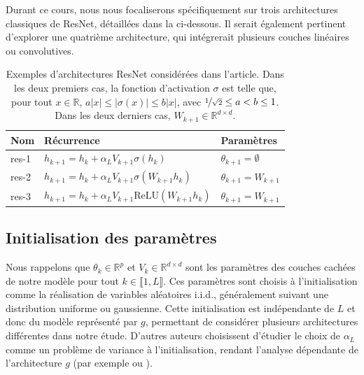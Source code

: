 Durant ce cours, nous nous focaliserons spécifiquement sur trois architectures classiques de ResNet, détaillées dans la  ci-dessous. Il serait également pertinent d'explorer une quatrième architecture, qui intégrerait plusieurs couches linéaires ou convolutives.

\begin{table}[H]
    \centering
    \begin{tabular}{lll}
        \hline
        \textbf{Nom} & \textbf{Récurrence} & \textbf{Paramètres} \\ \hline
        res-1 & \( h_{k+1} = h_k + \alpha_L V_{k+1}\sigma(h_k) \) & \( \theta_{k+1} = \emptyset \) \\
        res-2 & \( h_{k+1} = h_k + \alpha_L V_{k+1}\sigma(W_{k+1}h_k) \) & \( \theta_{k+1} = W_{k+1} \) \\
        res-3 & \( h_{k+1} = h_k + \alpha_L V_{k+1}\text{ReLU}(W_{k+1}h_k) \) & \( \theta_{k+1} = W_{k+1} \) \\ \hline
    \end{tabular}
    \caption{Exemples d'architectures ResNet considérées dans l'article. Dans les deux premiers cas, la fonction d'activation \( \sigma \) est telle que, pour tout \( x \in \mathbb{R} \), \( a|x| \leq |\sigma(x)| \leq b|x| \), avec \( \nicefrac{1}{\sqrt{2}} \leq a < b \leq 1 \). Dans les deux derniers cas, \( W_{k+1} \in \mathbb{R}^{d \times d} \).}
    \label{tab:resnet_architectures}
\end{table}

\subsection*{Initialisation des paramètres}
Nous rappelons que $\theta_k \in \mathbb{R}^p$ et $V_k \in \mathbb{R}^{d \times d}$ sont les paramètres des couches cachées de notre modèle pour tout $k \in \llbracket 1, L \rrbracket$. Ces paramètres sont choisis à l'initialisation comme la réalisation de variables aléatoires i.i.d., généralement suivant une distribution uniforme ou gaussienne. Cette initialisation est indépendante de $L$ et donc du modèle représenté par $g$, permettant de considérer plusieurs architectures différentes dans notre étude. D'autres auteurs choisissent d'étudier le choix de $\alpha_L$ comme un problème de variance à l'initialisation, rendant l'analyse dépendante de l'architecture $ g $ (par exemple \cite{Yang2017MeanFR} ou \cite{wang2022deepnet}).

